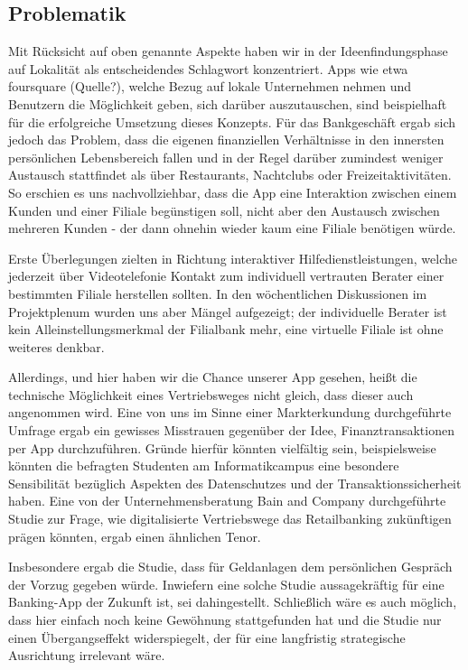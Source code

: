 
\subsection{Problematik}
Mit Rücksicht auf oben genannte Aspekte haben wir in der Ideenfindungsphase auf Lokalität als entscheidendes Schlagwort konzentriert. Apps wie etwa foursquare (Quelle?), welche Bezug auf lokale Unternehmen nehmen und Benutzern die Möglichkeit geben, sich darüber auszutauschen, sind beispielhaft für die erfolgreiche Umsetzung dieses Konzepts. Für das Bankgeschäft ergab sich jedoch das Problem, dass die eigenen finanziellen Verhältnisse in den innersten persönlichen Lebensbereich fallen und in der Regel darüber zumindest weniger Austausch stattfindet als über Restaurants, Nachtclubs oder Freizeitaktivitäten. So erschien es uns nachvollziehbar, dass die App eine Interaktion zwischen einem Kunden und einer Filiale begünstigen soll, nicht aber den Austausch zwischen mehreren Kunden - der dann ohnehin wieder kaum eine Filiale benötigen würde.

Erste Überlegungen zielten in Richtung interaktiver Hilfedienstleistungen, welche jederzeit über Videotelefonie Kontakt zum individuell vertrauten Berater einer bestimmten Filiale herstellen sollten. In den wöchentlichen Diskussionen im Projektplenum wurden uns aber Mängel aufgezeigt; der individuelle Berater ist kein Alleinstellungsmerkmal der Filialbank mehr, eine virtuelle Filiale ist ohne weiteres denkbar.

Allerdings, und hier haben wir die Chance unserer App gesehen, heißt die technische Möglichkeit eines Vertriebsweges nicht gleich, dass dieser auch angenommen wird. Eine von uns im Sinne einer Markterkundung durchgeführte Umfrage ergab ein gewisses Misstrauen gegenüber der Idee, Finanztransaktionen per App durchzuführen. Gründe hierfür könnten vielfältig sein, beispielsweise könnten die befragten Studenten am Informatikcampus eine besondere Sensibilität bezüglich Aspekten des Datenschutzes und der Transaktionssicherheit haben. Eine von der Unternehmensberatung Bain and Company durchgeführte Studie zur Frage, wie digitalisierte Vertriebswege das Retailbanking zukünftigen prägen könnten, ergab einen ähnlichen Tenor.

 Insbesondere ergab die Studie, dass für Geldanlagen dem persönlichen Gespräch der Vorzug gegeben würde. Inwiefern eine solche Studie aussagekräftig für eine Banking-App der Zukunft ist, sei dahingestellt. Schließlich wäre es auch möglich, dass hier einfach noch keine Gewöhnung stattgefunden hat und die Studie nur einen Übergangseffekt widerspiegelt, der für eine langfristig strategische Ausrichtung irrelevant wäre.

